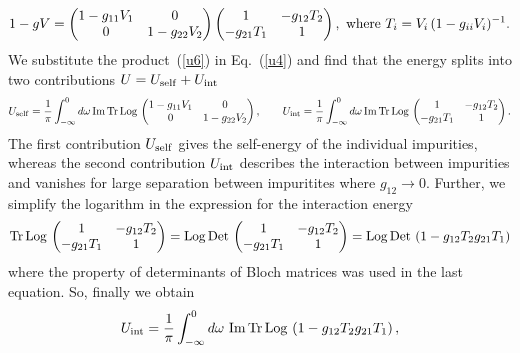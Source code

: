 \documentclass[twocolumn,showpacs,floatfix,longbibliography]{revtex4-1}
\begin{document}
\begin{widetext}
\begin{align}
	1-gV  =  \begin{pmatrix} 
		        1-g_{11}V_1 & 0\\ 
			0 & 1-g_{22}V_2 
	         \end{pmatrix} 
		 \begin{pmatrix} 
			 1 & -g_{12} T_2\\ 
			-g_{21} T_1 & 1 
	\end{pmatrix},{\,\,\rm where\,\,} T_i = V_i\,(1-g_{ii}V_i)^{-1}.  \label{u6}
\end{align}
We substitute the product~(\ref{u6}) in Eq.~(\ref{u4}) and find that the energy splits into two contributions $U = U_{\rm self}+U_{\rm int}$
\begin{align}
        U_{\rm self} = \frac{1}{\pi}\int_{-\infty}^0 d\omega\, {\rm Im\,Tr\,Log\,} \begin{pmatrix} 
		        1-g_{11}V_1 & 0\\ 
			0 & 1-g_{22}V_2 
	         \end{pmatrix},\qquad 
		      U_{\rm int} = \frac{1}{\pi}\int_{-\infty}^0 d\omega\, {\rm Im\,Tr\,Log\,} \begin{pmatrix} 
			 1 & -g_{12} T_2\\ 
			-g_{21} T_1 & 1 
	\end{pmatrix}.
\end{align}
The first contribution $U_{\rm self}$ gives the self-energy of the individual impurities, whereas the second contribution $U_{\rm int}$ describes the interaction between impurities and vanishes for large separation between impuritites where $g_{12}\rightarrow 0$. Further, we simplify  the logarithm in the expression for the interaction energy 
\begin{align} 
		{\rm Tr\, Log\,} 
		      \begin{pmatrix} 
			 1 & -g_{12} T_2\\ 
			-g_{21} T_1 & 1 
		      \end{pmatrix} =  
		{\rm Log\,Det\,} 
		      \begin{pmatrix} 
			 1 & -g_{12} T_2\\ 
			-g_{21} T_1 & 1 
		\end{pmatrix} = {\rm Log\,Det\,} \left( 1- g_{12} T_2 g_{21} T_1 \right)
\end{align}
where the property of determinants of Bloch matrices was used in the last equation. So, finally we obtain 
\begin{align}
		      U_{\rm int} = \frac{1}{\pi}\int_{-\infty}^0 d\omega\,\, {\rm Im\,Tr\, Log\,} \left( 1- g_{12} T_2 g_{21} T_1 \right),

\end{align}
\end{widetext}
\end{document}
